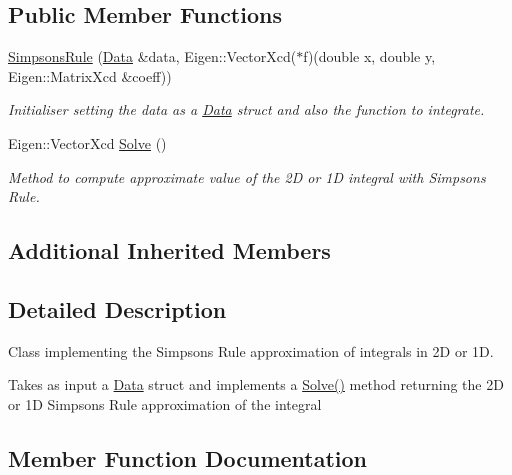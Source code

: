 \subsection*{Public Member Functions}
\begin{DoxyCompactItemize}
\item 
\mbox{\label{class_simpsons_rule_a091f7674b42ba3c2deb4d73e2129e490}} 
\hyperlink{class_simpsons_rule_a091f7674b42ba3c2deb4d73e2129e490}{Simpsons\+Rule} (\hyperlink{struct_data}{Data} \&data, Eigen\+::\+Vector\+Xcd($\ast$f)(double x, double y, Eigen\+::\+Matrix\+Xcd \&coeff))
\begin{DoxyCompactList}\small\item\em Initialiser setting the data as a \hyperlink{struct_data}{Data} struct and also the function to integrate. \end{DoxyCompactList}\item 
Eigen\+::\+Vector\+Xcd \hyperlink{class_simpsons_rule_a9925b07e44be9fc1644d3cbeb742078c}{Solve} ()
\begin{DoxyCompactList}\small\item\em Method to compute approximate value of the 2D or 1D integral with Simpson\textquotesingle{}s Rule. \end{DoxyCompactList}\end{DoxyCompactItemize}
\subsection*{Additional Inherited Members}


\subsection{Detailed Description}
Class implementing the Simpson\textquotesingle{}s Rule approximation of integrals in 2D or 1D. 

Takes as input a \hyperlink{struct_data}{Data} struct and implements a \hyperlink{class_simpsons_rule_a9925b07e44be9fc1644d3cbeb742078c}{Solve()} method returning the 2D or 1D Simpson\textquotesingle{}s Rule approximation of the integral 

\subsection{Member Function Documentation}
\mbox{\label{class_simpsons_rule_a9925b07e44be9fc1644d3cbeb742078c}} 
